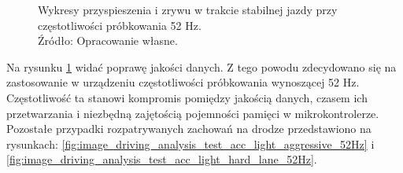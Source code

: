 \begin{figure}[H]
\centering
	\qquad
	
	\caption{Wykresy przyspieszenia i zrywu w trakcie stabilnej jazdy przy częstotliwości próbkowania 52 Hz.
	\\Źródło: Opracowanie własne.}
	\label{fig:image_driving_analysis_test_52Hz}
\end{figure}

Na rysunku \ref{fig:image_driving_analysis_test_52Hz} widać poprawę jakości danych. Z tego powodu zdecydowano się na zastosowanie w urządzeniu częstotliwości próbkowania wynoszącej 52 Hz. Częstotliwość ta stanowi kompromis pomiędzy jakością danych, czasem ich przetwarzania i niezbędną zajętością pojemności pamięci w mikrokontrolerze. Pozostałe przypadki rozpatrywanych zachowań na drodze przedstawiono na rysunkach: \ref{fig:image_driving_analysis_test_acc_light_aggressive_52Hz} i \ref{fig:image_driving_analysis_test_acc_light_hard_lane_52Hz}.

